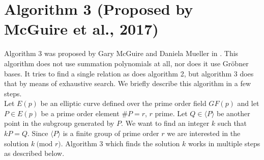 \documentclass[thesis=M,english]{FITthesis}[2012/10/20]
\theoremstyle{remark}
\theoremstyle{definition}
\begin{document}
\section{Algorithm 3 (Proposed by McGuire et al., 2017)}
Algorithm 3 was proposed by Gary McGuire and Daniela Mueller in \cite{guire}. This algorithm does not use summation polynomials at all, nor does it use Gröbner bases. It tries to find a single relation as does algorithm 2, but algorithm 3 does that by means of exhaustive search. We briefly describe this algorithm in a few steps. \\

\noindent Let $E(p)$ be an elliptic curve defined over the prime order field $GF(p)$ and let $P \in E(p)$ be a prime order element $\#P = r$, $r$ prime. Let $Q \in \langle P \rangle$ be  another point in the subgroup generated by $P.$ We want to find an integer $k$ such that $kP = Q.$ Since $\langle P \rangle$ is a finite group of prime order $r$ we are interested in the solution $k\ \text{(mod }r)$. Algorithm 3 which finds the solution $k$ works in multiple steps as described below.
\end{document}
